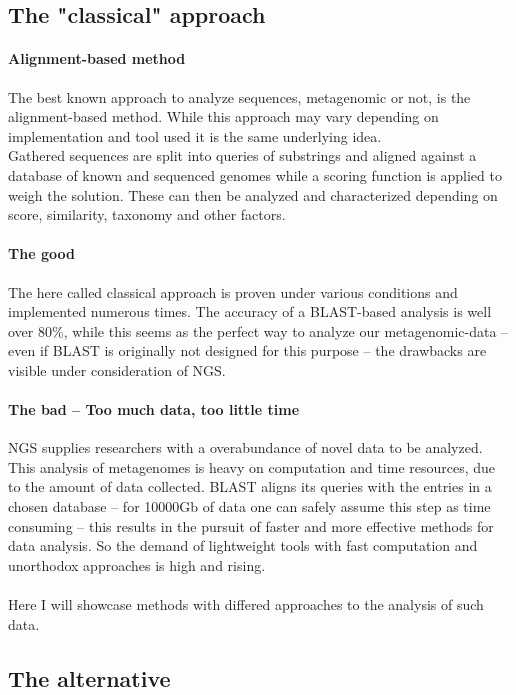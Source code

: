\documentclass[twocolumn]{bmcart}%
\begin{document}
\subsection*{The "classical" approach}
\paragraph*{Alignment-based method}
The best known approach to analyze sequences, metagenomic or not, is the alignment-based method. While this approach may vary depending on implementation and tool used it is the same underlying idea.\\
Gathered sequences are split into queries of substrings and aligned against a database of known and sequenced genomes while a scoring function is applied to weigh the  solution. These can then be analyzed and characterized depending on score, similarity, taxonomy and other factors.
\paragraph*{The good}
The here called classical approach is proven under various conditions and implemented numerous times. The accuracy of a BLAST-based analysis is well over 80\%\cite{doi:10.1142/9789814295291_0003}, while this seems as the perfect way to analyze our metagenomic-data -- even if BLAST is originally not designed for this purpose -- the drawbacks are visible under consideration of NGS.
\paragraph*{The bad -- Too much data, too little time}
NGS supplies researchers with a overabundance of novel data to be analyzed. This analysis of metagenomes is heavy on computation and time resources, due to the amount of data collected. BLAST aligns its queries with the entries in a chosen database -- for 10000Gb of data one can safely assume this step as time consuming -- this results in the pursuit of faster and more effective methods for data analysis. So the demand of lightweight tools with fast computation and unorthodox approaches is high and rising.\\
\paragraph*{}
Here I will showcase methods with differed approaches to the analysis of such data. 
\subsection*{The alternative}
\end{document}
